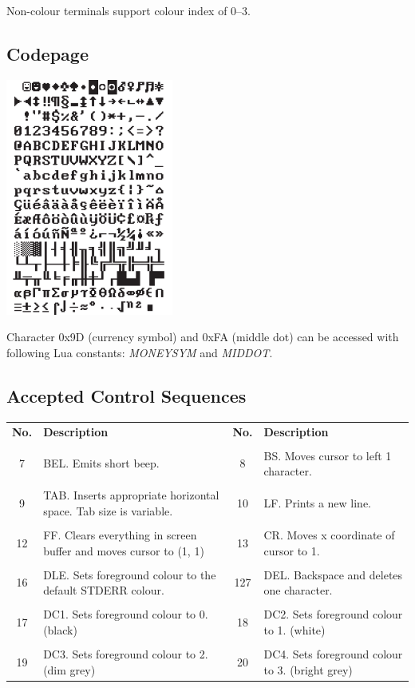\documentclass[10pt, stock]{memoir}
\begin{document}
Non-colour terminals support colour index of 0--3.

\subsection{Codepage}

{\center\includegraphics[height=21em]{mda.pdf}}

Character 0x9D (currency symbol) and 0xFA (middle dot) can be accessed with following Lua constants: \emph{MONEYSYM} and \emph{MIDDOT}.

\subsection{Accepted Control Sequences}

\begin{tabularx}{\textwidth}{c X c X}
	\textbf{\large No.} & \textbf{\large Description} & \textbf{\large No.} & \textbf{\large Description}
	\\ \\
	\endhead
	7 & BEL. Emits short beep. & 8 & BS. Moves cursor to left 1 character.
	\\ \\
	9 & TAB. Inserts appropriate horizontal space. Tab size is variable. & 10 & LF. Prints a new line.
	\\ \\
	12 & FF. Clears everything in screen buffer and moves cursor to (1, 1) & 13 & CR. Moves x coordinate of cursor to 1.
	\\ \\
	16 & DLE. Sets foreground colour to the default STDERR colour. & 127 & DEL. Backspace and deletes one character.
	\\ \\
	17 & DC1. Sets foreground colour to 0. (black) & 18 & DC2. Sets foreground colour to 1. (white)
	\\ \\
	19 & DC3. Sets foreground colour to 2. (dim grey) & 20 & DC4. Sets foreground colour to 3. (bright grey)
\end{tabularx}
\end{document}
